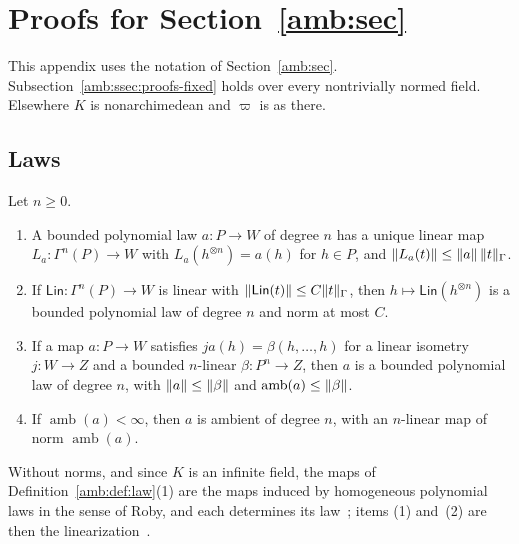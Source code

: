 \section{Proofs for Section~\ref{amb:sec}}\label{amb:app}

This appendix uses the notation of Section~\ref{amb:sec}. Subsection~\ref{amb:ssec:proofs-fixed} holds over every nontrivially normed field. Elsewhere $K$ is nonarchimedean and $\varpi$ is as there.

\subsection{Laws}\label{amb:ssec:laws}

\begin{lemma}[linearization]\label{amb:lem:linearization}
Let $n\ge0$.
\begin{enumerate}
\item A bounded polynomial law $a\colon P\to W$ of degree $n$ has a unique linear map $L_a\colon\Gamma^n(P)\to W$ with $L_a(h^{\otimes n})=a(h)$ for $h\in P$, and $\lVert L_a(t)\rVert\le\lVert a\rVert\,\lVert t\rVert_\Gamma$.
\item If $\mathsf{Lin}\colon\Gamma^n(P)\to W$ is linear with $\lVert \mathsf{Lin}(t)\rVert\le C\lVert t\rVert_\Gamma$, then $h\mapsto\mathsf{Lin}(h^{\otimes n})$ is a bounded polynomial law of degree $n$ and norm at most $C$.
\item If a map $a\colon P\to W$ satisfies $ja(h)=\beta(h,\dots,h)$ for a linear isometry $j\colon W\to Z$ and a bounded $n$\nobreakdash-linear $\beta\colon P^n\to Z$, then $a$ is a bounded polynomial law of degree $n$, with $\lVert a\rVert\le\lVert \beta\rVert$ and $\operatorname{amb}(a)\le\lVert \beta\rVert$.
\item If $\operatorname{amb}(a)<\infty$, then $a$ is ambient of degree $n$, with an $n$\nobreakdash-linear map of norm $\operatorname{amb}(a)$.
\end{enumerate}
\end{lemma}

Without norms, and since $K$ is an infinite field, the maps of Definition~\ref{amb:def:law}(1) are the maps induced by homogeneous polynomial laws in the sense of Roby, and each determines its law~\cite[Th.~I.1, Props.~I.1, I.8, IV.6]{Ro}; items (1) and~(2) are then the linearization~\cite[Th.~IV.1, Prop.~IV.5]{Ro}.

